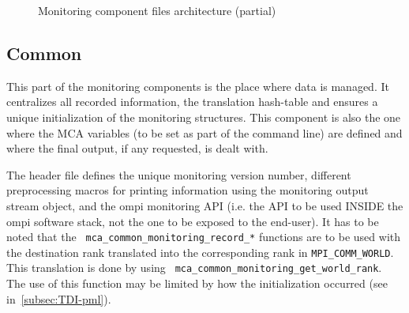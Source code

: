 \documentclass[notitlepage]{article}
\newcommand{\brkunds}[0]{\allowbreak\_}
\begin{document}
\begin{figure}
\caption{Monitoring component files architecture (partial)}
\label{fig:tree}
\end{figure}

\subsection{Common}
\label{subsec:TDI-common}
This part of the monitoring components is the place where data is
managed. It centralizes all recorded information, the translation
hash-table and ensures a unique initialization of the monitoring
structures. This component is also the one where the MCA variables (to
be set as part of the command line) are defined and where the final
output, if any requested, is dealt with.

The header file defines the unique monitoring version number,
different preprocessing macros for printing information using the
monitoring output stream object, and the ompi monitoring API (i.e. the
API to be used INSIDE the ompi software stack, not the one to be
exposed to the end-user). It has to be noted that the {\tt
  mca\brkunds{}common\brkunds{}monitoring\brkunds{}record\brkunds{}*}
functions are to be used with the destination rank translated into the
corresponding rank in {\tt MPI\brkunds{}COMM\brkunds{}WORLD}. This
translation is done by using {\tt
  mca\brkunds{}common\brkunds{}monitoring\brkunds{}get\brkunds{}world\brkunds{}rank}. The
use of this function may be limited by how the initialization occurred
(see in~\ref{subsec:TDI-pml}).
\end{document}
